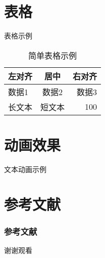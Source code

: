 \documentclass{beamer}
\begin{document}
\section{表格}
\begin{frame}{表格示例}
  \begin{table}
    \caption{简单表格示例}
    \centering
    \begin{tabular}{l|c|r}
      \toprule
      左对齐 & 居中 & 右对齐 \\
      \midrule
      数据1 & 数据2 & 数据3 \\
      长文本 & 短文本 & 100 \cite{ctex2020manual}\\
      \bottomrule
    \end{tabular}

  \end{table}
\end{frame}

\section{动画效果}
\begin{frame}{文本动画示例}
  \begin{seqpara}
  \end{seqpara}
\end{frame}

\section{参考文献}
\begin{frame}
  \frametitle{参考文献}
  
  
\end{frame}

\begin{frame}
  \centering
  \LARGE 谢谢观看

\end{frame}
\end{document}
